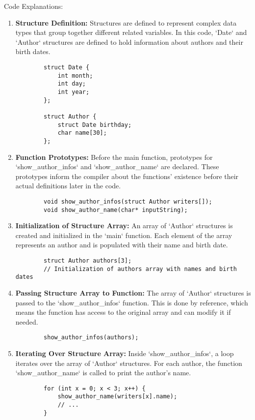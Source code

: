 \break
Code Explanations:
\begin{enumerate}
        \item \textbf{Structure Definition:} Structures are defined to represent complex data types that group together different related variables. In this code, `Date` and `Author` structures are defined to hold information about authors and their birth dates.
        \begin{verbatim}
        struct Date {
            int month;
            int day;
            int year;
        };
        
        struct Author {
            struct Date birthday;
            char name[30];
        };
        \end{verbatim}
    
        \item \textbf{Function Prototypes:} Before the main function, prototypes for `show\_author\_infos` and `show\_author\_name` are declared. These prototypes inform the compiler about the functions' existence before their actual definitions later in the code.
        \begin{verbatim}
        void show_author_infos(struct Author writers[]);
        void show_author_name(char* inputString);
        \end{verbatim}
    
        \item \textbf{Initialization of Structure Array:} An array of `Author` structures is created and initialized in the `main` function. Each element of the array represents an author and is populated with their name and birth date.
        \begin{verbatim}
        struct Author authors[3];
        // Initialization of authors array with names and birth dates
        \end{verbatim}
    
        \item \textbf{Passing Structure Array to Function:} The array of `Author` structures is passed to the `show\_author\_infos` function. This is done by reference, which means the function has access to the original array and can modify it if needed.
        \begin{verbatim}
        show_author_infos(authors);
        \end{verbatim}
    
        \item \textbf{Iterating Over Structure Array:} Inside `show\_author\_infos`, a loop iterates over the array of `Author` structures. For each author, the function `show\_author\_name` is called to print the author's name.
        \begin{verbatim}
        for (int x = 0; x < 3; x++) {
            show_author_name(writers[x].name);
            // ...
        }
        \end{verbatim}
    

\end{enumerate}
